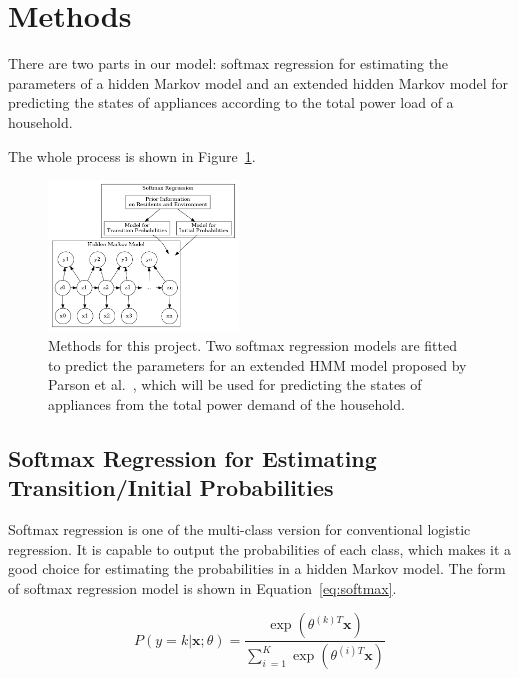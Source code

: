 \documentclass[sigconf]{acmart}
\begin{document}
\section{Methods}

There are two parts in our model: softmax regression for estimating
the parameters of a hidden Markov model and an extended hidden Markov
model for predicting the states of appliances according to the total
power load of a household.

The whole process is shown in Figure~\ref{fig:methods}.

\begin{figure}[ht]
  \centering
  \includegraphics[width=0.45\textwidth]{figures/methods}
  \caption{\label{fig:methods} Methods for this project. Two softmax
    regression models are fitted to predict the parameters for an
    extended HMM model proposed by Parson et al.~\cite{parson2012non},
    which will be used for predicting the states of appliances from
    the total power demand of the household.}
\end{figure}

\subsection{Softmax Regression for Estimating Transition/Initial
  Probabilities}

Softmax regression is one of the multi-class version for conventional
logistic regression. It is capable to output the probabilities of each
class, which makes it a good choice for estimating the probabilities
in a hidden Markov model. The form of softmax regression model is
shown in Equation~\ref{eq:softmax}.~\cite{heckerman1997models}

\begin{equation}
P(y = k|\mathbf{x}; \theta) = \frac{\exp(\theta^{(k)T}\mathbf{x})}{\sum_{i~= 1}^{K}\exp(\theta^{(i)T}\mathbf{x})}
\label{eq:softmax}
\end{equation}
\end{document}
